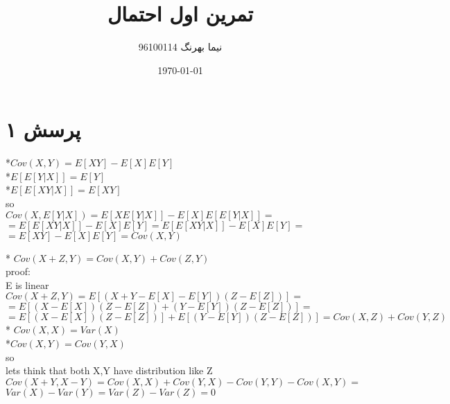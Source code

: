\documentclass[a4paper]{article}
\title{تمرین اول احتمال}
\author{نیما بهرنگ 96100114}
\date{\today}
\begin{document}
\maketitle
{}


\section*{پرسش ۱}
\begin{enumerate}
\begin{latin}
\item{}
*$Cov(X,Y) = E[XY]-E[X]E[Y]$\\
*$E[E[Y|X]]=E[Y]$\\
*$E[E[XY|X]]=E[XY]$\\
so\\
$ Cov(X,E[Y|X]) = E[X E[Y|X]] - E[X]E[E[Y|X]]= $\\
$ =E[E[XY|X]]-E[X]E[Y] = E[E[XY|X]] -E[X]E[Y]=$\\
$=E[XY]-E[X]E[Y] = Cov(X,Y)$

\item{}
* $Cov(X+Z,Y) = Cov(X,Y) + Cov(Z,Y)$\\
proof:\\
E is linear \\
$Cov(X+Z,Y) = E[(X+Y-E[X]-E[Y])(Z-E[Z])]=$\\
$= E[(X - E[X])(Z-E[Z]) + (Y-E[Y])(Z-E[Z])] = $\\
$= E[(X-E[X])(Z-E[Z])] + E[(Y-E[Y])(Z-E[Z])] = Cov(X,Z)+Cov(Y,Z)$\\
* $Cov(X,X) =Var(X)$\\
*$ Cov(X,Y)=Cov(Y,X)$\\
so\\
lets think that both X,Y have distribution like Z\\
$ Cov(X+Y,X-Y) = Cov(X,X)+Cov(Y,X)-Cov(Y,Y)-Cov(X,Y) = $\\
$Var(X) - Var(Y) = Var(Z) - Var(Z) = 0$
\end{latin}
\end{enumerate}
\pagebreak
\end{document}
